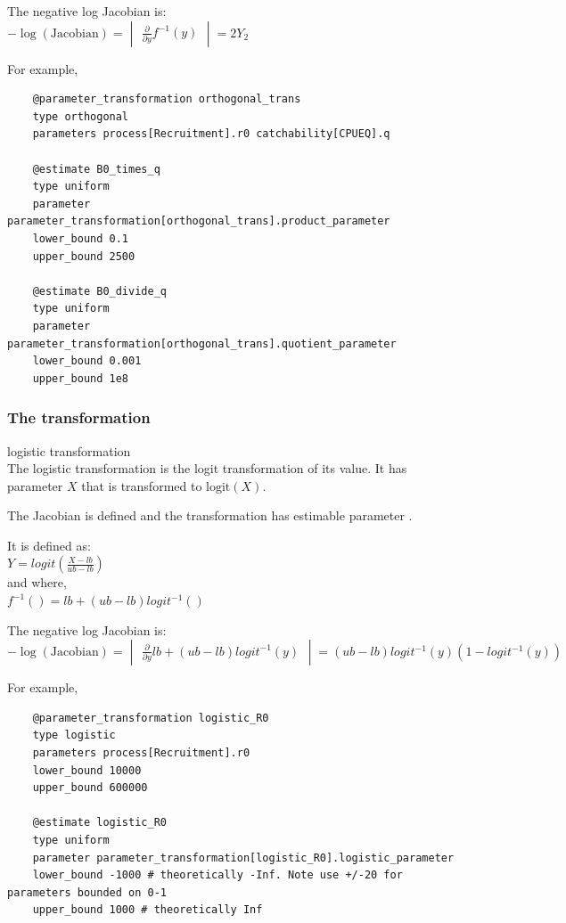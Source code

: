 The negative log Jacobian is: \\
$-\log(\text{Jacobian}) = \begin{vmatrix} \frac{\partial}{\partial y} f^{-1}(y) \end{vmatrix} = 2Y_2$

For example,
{\small{\begin{verbatim}
	@parameter_transformation orthogonal_trans
	type orthogonal
	parameters process[Recruitment].r0 catchability[CPUEQ].q
	
	@estimate B0_times_q
	type uniform
	parameter parameter_transformation[orthogonal_trans].product_parameter
	lower_bound 0.1
	upper_bound 2500
	
	@estimate B0_divide_q
	type uniform
	parameter parameter_transformation[orthogonal_trans].quotient_parameter
	lower_bound 0.001
	upper_bound 1e8	
\end{verbatim}}}

\subsubsection{The  transformation}  \label{sec:Transformation-Logistic}

logistic transformation\\

The logistic transformation is the logit transformation of its value. It has parameter $X$ that is transformed to $\text{logit}(X)$.

The Jacobian is defined and the transformation has estimable parameter .

It is defined as: \\
$Y = logit(\frac{X - lb}{ub - lb})$\\

and where,\\
$f^{-1}() = lb +(ub - lb)  logit^{-1}()$

The negative log Jacobian is: \\
$-\log(\text{Jacobian}) = \begin{vmatrix} \frac{\partial}{\partial y}   lb +(ub - lb)  logit^{-1}(y) \end{vmatrix} =  (ub - lb)logit^{-1}(y)\left(1 - logit^{-1}(y)\right)$

For example,
{\small{\begin{verbatim}
	@parameter_transformation logistic_R0
	type logistic
	parameters process[Recruitment].r0
	lower_bound 10000
	upper_bound 600000
	
	@estimate logistic_R0
	type uniform
	parameter parameter_transformation[logistic_R0].logistic_parameter
	lower_bound -1000 # theoretically -Inf. Note use +/-20 for parameters bounded on 0-1
	upper_bound 1000 # theoretically Inf
\end{verbatim}}}
	
